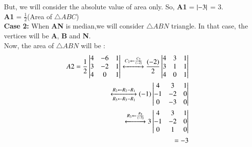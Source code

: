 But, we will consider the absolute value of area only. So, \textbf{A1} = $\left\vert-3\right\vert$ = 3.\\
 \textbf{A1} = $\frac{1}{2}$(Area of $\triangle ABC$)\\
\textbf{Case 2:} When \textbf{AN} is median,we will consider $ \triangle ABN $ triangle. In that case, the vertices will be \textbf{A}, \textbf{B} and \textbf{N}.\\
Now, the area of $ \triangle ABN $ will be :\\
\begin{equation}
\begin{aligned}
    A2 = \frac{1}{2}\begin{vmatrix}
      4       & -6    & 1 \\ 
      3       & -2    & 1 \\
      4       & 0     & 1 \\
      
    \end{vmatrix} \xleftrightarrow[]{C_2\leftarrow \frac{C_2}{(-2)}} \frac{(-2)}{2}\begin{vmatrix}
      4       &3    & 1 \\ 
      3       &1    & 1 \\
      4       & 0    & 1 \\
      
    \end{vmatrix}\\
    \xleftrightarrow[R_3 \leftarrow R_3-R_1]{R_2\leftarrow R_2-R_1}
    (-1)\begin{vmatrix}
      4       & 3    & 1 \\ 
      -1       & -2    & 0 \\
      0       & -3   & 0 \\
      
    \end{vmatrix} \\ \xleftrightarrow[]{R_3 \leftarrow \frac{R_3}{(-3)}}
    3 \begin{vmatrix}
      4       & 3    & 1 \\ 
      -1       & -2    & 0 \\
      0       & 1   & 0 \\
      
    \end{vmatrix}\\
    =-3
   \end{aligned}
  \end{equation}
